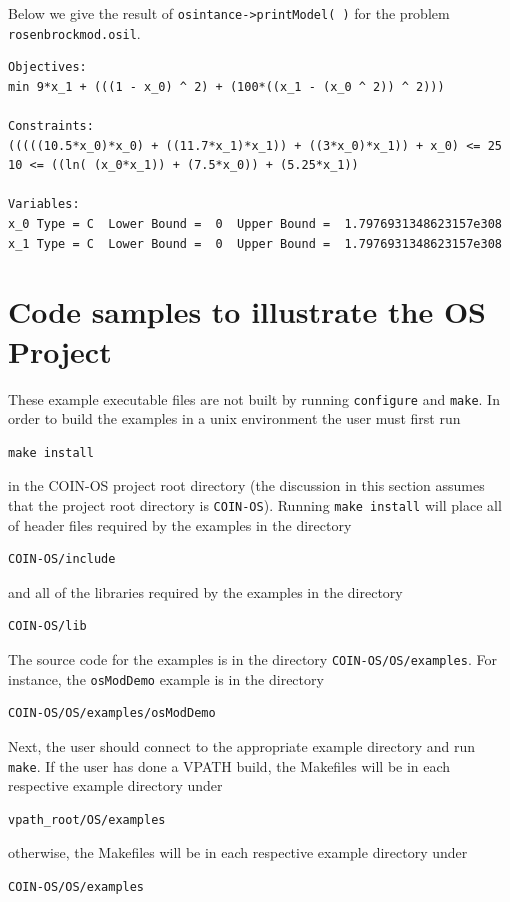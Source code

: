 \documentclass[11pt]{article}
\renewcommand{\_}{{\char"5F}}
\renewcommand{\{}{{\char"7B}}
\renewcommand{\}}{{\char"7D}}
\renewcommand{\^}{{\char"0D}}
\renewcommand{\'}{{\char"0D}}
\begin{document}
\begin{enumerate}[Step 1:]
 
Below we give the result of {\tt osintance->printModel( )} for the problem {\tt rosenbrockmod.osil}.
\begin{verbatim}
Objectives:
min 9*x_1 + (((1 - x_0) ^ 2) + (100*((x_1 - (x_0 ^ 2)) ^ 2)))

Constraints:
(((((10.5*x_0)*x_0) + ((11.7*x_1)*x_1)) + ((3*x_0)*x_1)) + x_0) <= 25  
10 <= ((ln( (x_0*x_1)) + (7.5*x_0)) + (5.25*x_1))

Variables:
x_0 Type = C  Lower Bound =  0  Upper Bound =  1.7976931348623157e308
x_1 Type = C  Lower Bound =  0  Upper Bound =  1.7976931348623157e308
\end{verbatim}
 


\section{Code samples to illustrate the OS Project}\label{section:examples}

These example executable files are not built by running {\tt configure} and {\tt make}.  In order to build the examples
in a unix environment the user must first run
\begin{verbatim}
make install
\end{verbatim}
in the COIN-OS project root directory (the discussion in this section assumes that the project root directory is
{\tt COIN-OS}).  Running {\tt make install}  will  place all of header files required by the examples in the directory
\begin{verbatim}
COIN-OS/include
\end{verbatim}
and all of the libraries required by the examples in the directory
\begin{verbatim}
COIN-OS/lib
\end{verbatim}
The source code for the examples is in the directory {\tt COIN-OS/OS/examples}.  For instance, the {\tt osModDemo}
example is in the directory
\begin{verbatim}
COIN-OS/OS/examples/osModDemo
\end{verbatim}
Next, the user should connect to the appropriate example directory and run {\tt make}.
If the user has done a VPATH build, the Makefiles will be in each respective example directory under
\begin{verbatim}
vpath_root/OS/examples
\end{verbatim}
otherwise, the Makefiles will be in each respective example directory under
\begin{verbatim}
COIN-OS/OS/examples
\end{verbatim}


\end{enumerate}
\end{document}
